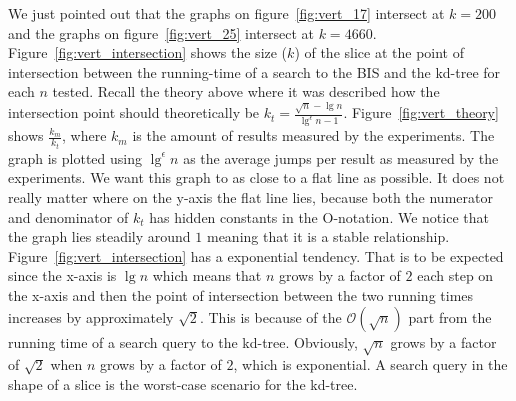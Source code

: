 We just pointed out that the graphs on figure~\ref{fig:vert_17} intersect at $k = 200$ and the graphs on  figure~\ref{fig:vert_25} intersect at $k = 4660$. Figure~\ref{fig:vert_intersection} shows the size ($k$) of the slice at the point of intersection between the running-time of a search to the BIS and the kd-tree for each $n$ tested. Recall the theory above where it was described how the intersection point should theoretically be $k_t = \frac{\sqrt{n} - \lg n}{\lg^\epsilon n - 1}$. Figure~\ref{fig:vert_theory} shows $\frac{k_m}{k_t}$, where $k_m$ is the amount of results measured by the experiments. The graph is plotted using $\lg^\epsilon n$ as the average jumps per result as measured by the experiments. We want this graph to as close to a flat line as possible. It does not really matter where on the y-axis the flat line lies, because both the numerator and denominator of $k_t$ has hidden constants in the O-notation. We notice that the graph lies steadily around $1$ meaning that it is a stable relationship. Figure~\ref{fig:vert_intersection} has a exponential tendency. That is to be expected since the x-axis is $\lg n$ which means that $n$ grows by a factor of $2$ each step on the x-axis and then the point of intersection between the two running times increases by approximately $\sqrt{2}$. This is because of the $\mathcal{O}(\sqrt{n})$ part from the running time of a search query to the kd-tree. Obviously, $\sqrt{n}$ grows by a factor of $\sqrt{2}$ when $n$ grows by a factor of $2$, which is exponential. A search query in the shape of a slice is the worst-case scenario for the kd-tree.

